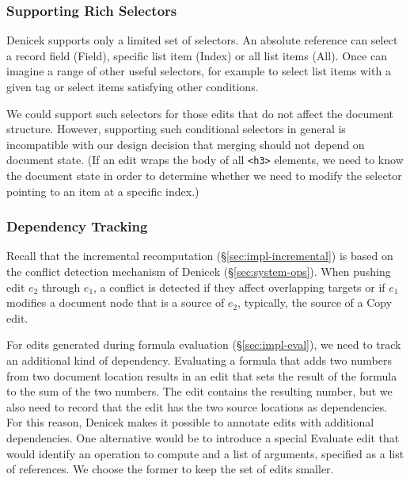 \documentclass[sigconf,anonymous,screen]{acmart}
\newcommand{\ident}[1]{{\sffamily #1}}
\begin{document}
\subsubsection*{Supporting Rich Selectors}
Denicek supports only a limited set of selectors. An absolute reference can select a record
field (\ident{Field}), specific list item (\ident{Index}) or all list items (\ident{All}).
Once can imagine a range of other useful selectors, for example to select list items with a
given tag or select items satisfying other conditions.

We could support such selectors for those edits that do not affect the document
structure. However, supporting such conditional selectors in general is incompatible with our
design decision that merging should not depend on document state. (If an edit wraps the body of all
{\small\Verb_<h3>_} elements, we need to know the document state in order to determine whether
we need to modify the selector pointing to an item at a specific index.)

\subsubsection*{Dependency Tracking}
Recall that the incremental recomputation (\S\ref{sec:impl-incremental}) is based on the
conflict detection mechanism of Denicek (\S\ref{sec:system-ops}). When pushing edit $e_2$ through
$e_1$, a conflict is detected if they affect overlapping targets or if $e_1$ modifies a
document node that is a source of $e_2$, typically, the source of a \ident{Copy} edit.

For edits generated during formula evaluation (\S\ref{sec:impl-eval}), we need to track an
additional kind of dependency. Evaluating a formula that adds two numbers from two document
location results in an edit that sets the result of the formula to the sum of the two numbers.
The edit contains the resulting number, but we also need to record that the edit has the two
source locations as dependencies. For this reason, Denicek makes it possible to annotate edits
with additional dependencies. One alternative would be to introduce a special \ident{Evaluate}
edit that would identify an operation to compute and a list of arguments, specified as a list
of references. We choose the former to keep the set of edits smaller.


\end{document}
